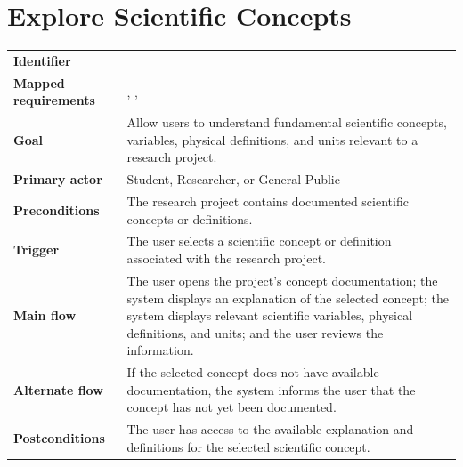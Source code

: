 \section{Explore Scientific Concepts}
\begin{tabularx}{\linewidth}{L{3.5cm}Y}
\toprule
\textbf{Identifier} & \\
\textbf{Mapped requirements} & , , \\
\textbf{Goal} & Allow users to understand fundamental scientific concepts, variables, physical definitions, and units relevant to a research project.\\
\textbf{Primary actor} & Student, Researcher, or General Public\\
\textbf{Preconditions} & The research project contains documented scientific concepts or definitions.\\
\textbf{Trigger} & The user selects a scientific concept or definition associated with the research project.\\
\textbf{Main flow} & The user opens the project's concept documentation; the system displays an explanation of the selected concept; the system displays relevant scientific variables, physical definitions, and units; and the user reviews the information.\\
\textbf{Alternate flow} & If the selected concept does not have available documentation, the system informs the user that the concept has not yet been documented.\\
\textbf{Postconditions} & The user has access to the available explanation and definitions for the selected scientific concept.\\
\bottomrule
\end{tabularx}


